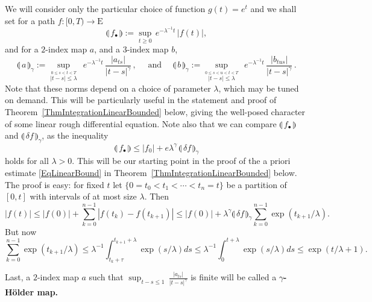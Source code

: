 \documentclass[11pt,a4paper]{amsart}
\renewcommand{\leq}{\leqslant}
\renewcommand{\geq}{\geqslant}
\newcommand{\ssk}{\smallskip}
\numberwithin{equation}{section} %
\begin{document}
We will consider only the particular choice of function $g(t) = e^{t}$ and we shall set for a path $f : [0,T)\rightarrow \textrm{E}$
\begin{equation}
\label{EqDefnNormFunction}
\llparenthesis\, f_\bullet \,\rrparenthesis :=  \underset{t\geq 0}{\sup}\,e^{-\lambda^{-1} t}\,\big| f(t) \big|,
\end{equation}
and for a $2$-index map $a$, and a  $3$-index map $b$,
\begin{equation}
\label{EqDefnNormMultiIndexMaps}
\llparenthesis\, a \,\rrparenthesis_\gamma := \underset{\stackrel{0\leq s<t<T}{|t-s|\le \lambda}}{\sup} \;\, e^{-\lambda^{-1} t} \,\frac{\big| a_{ts}\big|}{|t-s|^\gamma}\,, \quad \textrm{ and }\quad 
\llparenthesis\, b \,\rrparenthesis_\gamma := \underset{\stackrel{0\leq s< u<t<T}{{|t-s|\le \lambda}}}{\sup} \;\, e^{-\lambda^{-1} t} \,\frac{\big| b_{tus}\big|}{|t-s|^\gamma}\,.
\end{equation}
Note that these norms depend on a choice of parameter $\lambda$, which may be tuned on demand. This will be particularly useful in the statement and proof of Theorem~\ref{ThmIntegrationLinearBounded} below, giving the well-posed character of some linear rough differential equation. Note also that we can compare $\llparenthesis\, f_\bullet \,\rrparenthesis$ and $\llparenthesis\, \delta f \,\rrparenthesis_\gamma$, as the inequality
$$
\llparenthesis\, f_\bullet \,\rrparenthesis \leq \big|f_0\big| + e \lambda^\gamma\,\llparenthesis\, \delta f \,\rrparenthesis_\gamma
$$
holds for all $\lambda>0$. This will be our starting point in the proof of the a priori estimate \eqref{EqLinearBound} in Theorem~\ref{ThmIntegrationLinearBounded} below. The proof is easy: for fixed $t$ let $\{0=t_0< t_1 < \cdots < t_n = t\}$ be a partition of $[0,t]$ with intervals of at most size $\lambda$. Then 
$$
|f(t)| \le |f(0)| + \sum_{k=0}^{n-1}|f(t_k)-f(t_{k+1})| \le  |f(0)| +  \lambda^\gamma  \llparenthesis\, \delta f \,\rrparenthesis_\gamma \sum_{k=0}^{n-1} \exp(t_{k+1}/\lambda).
$$
But now
$$
\sum_{k=0}^{n-1} \exp(t_{k+1}/\lambda)
\le   \lambda^{-1}\int_{t_{k}+\tau}^{t_{k+1}+\lambda} \exp(s/\lambda) d s \le  \lambda^{-1} \int_0^{t+\lambda} \exp(s/\lambda) d s \le \exp(t/\lambda + 1).
$$

\ssk

Last, a $2$-index map $a$ such that $\sup_{t-s\leq 1}\,\frac{| a_{ts} |}{|t-s|^\gamma}$ is finite will be called a $\gamma$\textbf{-H\"older map.}


\end{document}
